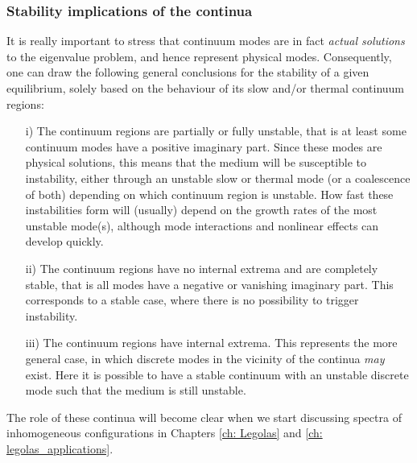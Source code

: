 \subsubsection{Stability implications of the continua}
It is really important to stress that continuum modes are in fact \emph{actual solutions} to the eigenvalue problem, and hence represent physical modes. Consequently, one can draw the following general conclusions for the stability of a given equilibrium, solely based on the behaviour of its slow and/or thermal continuum regions:

\begin{itemize}
	\item[i)] The continuum regions are partially or fully unstable, that is at least some continuum modes have a positive imaginary part. Since these modes are physical solutions, this means that the medium will be susceptible to instability, either through an unstable slow or thermal mode (or a coalescence of both) depending on which continuum region is unstable. How fast these instabilities form will (usually) depend on the growth rates of the most unstable mode(s), although mode interactions and nonlinear effects can develop quickly.
	\item[ii)] The continuum regions have no internal extrema and are completely stable, that is all modes have a negative or vanishing imaginary part. This corresponds to a stable case, where there is no possibility to trigger instability.
	\item[iii)] The continuum regions have internal extrema. This represents the more general case, in which discrete modes in the vicinity of the continua \textit{may} exist. Here it is possible to have a stable continuum with an unstable discrete mode such that the medium is still unstable.
\end{itemize}

The role of these continua will become clear when we start discussing spectra of inhomogeneous configurations in Chapters \ref{ch: Legolas} and \ref{ch: legolas_applications}.

\cleardoublepage
